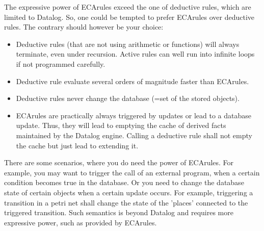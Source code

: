 The expressive power of ECArules exceed the one of deductive rules, which are
limited to Datalog. So, one could be tempted to prefer ECArules over deductive rules.
The contrary should however be your choice:

\begin{itemize}

\item Deductive rules (that are not using arithmetic or functions) will always terminate,
even under recursion.
Active rules can well run into infinite loops if not programmed carefully.

\item Deductive rule evaluate several orders of magnitude faster than ECArules.

\item Deductive rules never change the database (=set of the stored objects).

\item ECArules are practically always triggered by updates or lead to a database update.
Thus, they will lead to emptying the cache of derived facts maintained by the Datalog
engine. Calling a deductive rule shall not empty the cache but just lead to extending it.

\end{itemize}

There are some scenarios, where you do need the power of ECArules. For example, you may want
to trigger the call of an external program, when a certain condition becomes true in the
database. Or you need to change the database state of certain objects when a certain
update occurs. For example, triggering a transition in a petri net shall change the state of
the 'places' connected to the triggered transition. Such semantics is beyond Datalog and requires
more expressive power, such as provided by ECArules.

